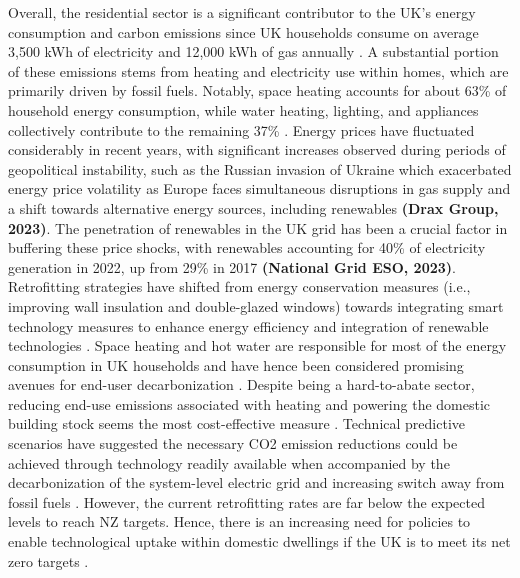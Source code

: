 Overall, the residential sector is a significant contributor to the UK's energy consumption and carbon emissions since UK households consume on average 3,500 kWh of electricity and 12,000 kWh of gas annually \cite{department_for_business_energy__industrial_strategy_dbeis_energy_2022}. A substantial portion of these emissions stems from heating and electricity use within homes, which are primarily driven by fossil fuels. Notably, space heating accounts for about 63\% of household energy consumption, while water heating, lighting, and appliances collectively contribute to the remaining 37\% \cite{palmer_united_2014}. Energy prices have fluctuated considerably in recent years, with significant increases observed during periods of geopolitical instability, such as the Russian invasion of Ukraine which exacerbated energy price volatility as Europe faces simultaneous disruptions in gas supply and a shift towards alternative energy sources, including renewables \textbf{(Drax Group, 2023)}. The penetration of renewables in the UK grid has been a crucial factor in buffering these price shocks, with renewables accounting for 40\% of electricity generation in 2022, up from 29\% in 2017 \textbf{(National Grid ESO, 2023)}. Retrofitting strategies have shifted from energy conservation measures (i.e., improving wall insulation and double-glazed windows) towards integrating smart technology measures to enhance energy efficiency and integration of renewable technologies \cite{ejidike_global_2023}. Space heating and hot water are responsible for most of the energy consumption in UK households and have hence been considered promising avenues for end-user decarbonization \cite{lowe_technical_2007, kesicki_costs_2012}. Despite being a hard-to-abate sector, reducing end-use emissions associated with heating and powering the domestic building stock seems the most cost-effective measure \cite{kesicki_costs_2012, royapoor_towards_2023}. Technical predictive scenarios have suggested the necessary CO2 emission reductions could be achieved through technology readily available when accompanied by the decarbonization of the system-level electric grid and increasing switch away from fossil fuels \cite{lowe_technical_2007, kesicki_costs_2012, miu_simple_2018}. However, the current retrofitting rates are far below the expected levels to reach NZ targets. Hence, there is an increasing need for policies to enable technological uptake within domestic dwellings if the UK is to meet its net zero targets \cite{wang_innovative_2022, miu_simple_2018}. \\

